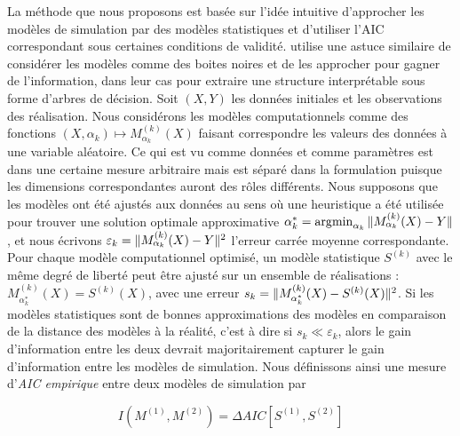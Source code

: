 {La méthode que nous proposons est basée sur l'idée intuitive d'approcher les modèles de simulation par des modèles statistiques et d'utiliser l'AIC correspondant sous certaines conditions de validité. \cite{2017arXiv170609773B} utilise une astuce similaire de considérer les modèles comme des boites noires et de les approcher pour gagner de l'information, dans leur cas pour extraire une structure interprétable sous forme d'arbres de décision. Soit $(X,Y)$ les données initiales et les observations des réalisation. Nous considérons les modèles computationnels comme des fonctions $(X,\alpha_k) \mapsto M_{\alpha_k}^{(k)}(X)$ faisant correspondre les valeurs des données à une variable aléatoire. Ce qui est vu comme données et comme paramètres est dans une certaine mesure arbitraire mais est séparé dans la formulation puisque les dimensions correspondantes auront des rôles différents. Nous supposons que les modèles ont été ajustés aux données au sens où une heuristique a été utilisée pour trouver une solution optimale approximative $\alpha^{\ast}_k = \operatorname*{\arg\!\min}_{\alpha_k}\| M_{\alpha_k}^{(k)}(X) - Y \|$, et nous écrivons $\varepsilon_k = \| M_{\alpha_k}^{(k)}(X) - Y \|^2$ l'erreur carrée moyenne correspondante. Pour chaque modèle computationnel optimisé, un modèle statistique $S^{(k)}$ avec le même degré de liberté peut être ajusté sur un ensemble de réalisations : $M^{(k)}_{\alpha^{\ast}_k}(X) = S^{(k)} (X)$, avec une erreur $s_k = \| M_{\alpha^{\ast}_k}^{(k)}(X) - S^{(k)}(X) \|^2$. Si les modèles statistiques sont de bonnes approximations des modèles en comparaison de la distance des modèles à la réalité, c'est à dire si $s_k \ll \varepsilon_k$, alors le gain d'information entre les deux devrait majoritairement capturer le gain d'information entre les modèles de simulation. Nous définissons ainsi une mesure d'\emph{AIC empirique} entre deux modèles de simulation par
}


\begin{equation}
I\left( M^{(1)}, M^{(2)}\right) = \Delta AIC \left[S^{(1)},S^{(2)}\right]
\end{equation}


%
%


